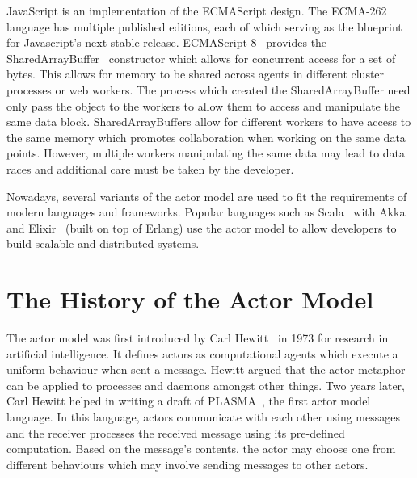 \documentclass[oneside]{um-fict}
\begin{document}
JavaScript is an implementation of the ECMAScript design. The ECMA-262 language has multiple published editions, each of which serving as the blueprint for Javascript's next stable release. ECMAScript 8~\cite{ecmascript} provides the SharedArrayBuffer~\cite{sharedarraybuffer} constructor which allows for concurrent access for a set of bytes. This allows for memory to be shared across agents in different cluster processes or web workers. The process which created the SharedArrayBuffer need only pass the object to the workers to allow them to access and manipulate the same data block. SharedArrayBuffers allow for different workers to have access to the same memory which promotes collaboration when working on the same data points. However, multiple workers manipulating the same data may lead to data races and additional care must be taken by the developer.

Nowadays, several variants of the actor model are used to fit the requirements of modern languages and frameworks. Popular languages such as Scala~\cite{scala} with Akka~\cite{akka} and Elixir~\cite{elixir} (built on top of Erlang) use the actor model to allow developers to build scalable and distributed systems.

\section{The History of the Actor Model}
The actor model was first introduced by Carl Hewitt~\cite{hewitt1973session}\cite{43years} in 1973 for research in artificial intelligence. It defines actors as computational agents which execute a uniform behaviour when sent a message. Hewitt argued that the actor metaphor can be applied to processes and daemons amongst other things. Two years later, Carl Hewitt helped in writing a draft of PLASMA~\cite{plasma}\cite{chewitthowto}, the first actor model language. In this language, actors communicate with each other using messages and the receiver processes the received message using its pre-defined computation. Based on the message's contents, the actor may choose one from different behaviours which may involve sending messages to other actors.
\end{document}
